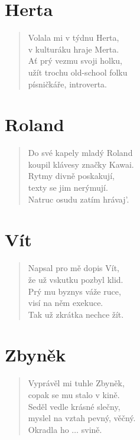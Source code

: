 \section*{Herta}
\begin{verse}
Volala mi v týdnu Herta,\\
v kulturáku hraje Merta.\\
Ať prý vezmu svoji holku,\\
užít trochu old-school folku\\
písničkáře, introverta.	
\end{verse}

\section*{Roland}
\begin{verse}
Do své kapely mladý Roland\\
koupil klávesy značky Kawai.\\
Rytmy divně poskakují,\\
texty se jim nerýmují.\\
Natruc osudu zatím hrávaj'.	
\end{verse}

\section*{Vít}
\begin{verse}
Napsal pro mě dopis Vít,\\
že už vskutku pozbyl klid.\\
Prý mu byznys váže ruce,\\
visí na něm exekuce.\\
Tak už zkrátka nechce žít.	
\end{verse}

\section*{Zbyněk}
\begin{verse}
Vyprávěl mi tuhle Zbyněk,\\
copak se mu stalo v kině.\\
Seděl vedle krásné slečny,\\
myslel na vztah pevný, věčný.\\
Okradla ho $\ldots$ svině.
\end{verse}


